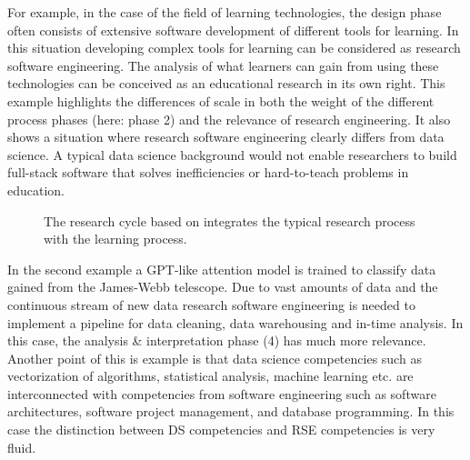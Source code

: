 \documentclass[
        english,biblatex
    ]{lni}
\begin{document}
    For example, in the case of the field of learning technologies, the
    design phase often consists of extensive software development of
    different tools for learning. In this situation developing complex
    tools for learning can be considered as research software
    engineering. The analysis of what learners can gain from using these
    technologies can be conceived as an educational research in its own
    right. This example highlights the differences of scale in both the
    weight of the different process phases (here: phase 2) and the
    relevance of research engineering. It also shows a situation where
    research software engineering clearly differs from data science. A
    typical data science background would not enable researchers to
    build full-stack software that solves inefficiencies or
    hard-to-teach problems in education.

    \begin{figure}


    \caption{\label{fig-research_cycle}The research cycle based on
    \autocite{wildt2009forschendes} integrates the typical research
    process with the learning process.}

    \end{figure}%

    In the second example a GPT-like attention model is trained to
    classify data gained from the James-Webb telescope. Due to vast
    amounts of data and the continuous stream of new data research
    software engineering is needed to implement a pipeline for data
    cleaning, data warehousing and in-time analysis. In this case, the
    analysis \& interpretation phase (4) has much more relevance.
    Another point of this is example is that data science competencies
    such as vectorization of algorithms, statistical analysis, machine
    learning etc. are interconnected with competencies from software
    engineering such as software architectures, software project
    management, and database programming. In this case the distinction
    between DS competencies and RSE competencies is very fluid.
\end{document}
